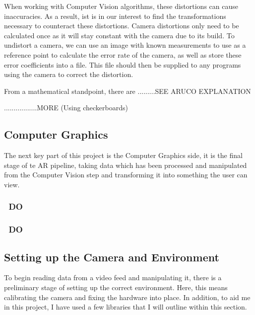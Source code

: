 \documentclass[11pt]{article}
\begin{document}
When working with Computer Vision algorithms, these distortions can cause
inaccuracies. As a result, ist is in our interest to find the transformations
necessary to counteract these distortions. Camera distortions only need to be 
calculated once as it will stay constant with the camera due to its build.
To undistort a camera, we can use an image with known measurements to use
as a reference point to calculate the error rate of the camera, as well as
store these error coefficients into a file. This file should then be supplied
to any programs using the camera to correct the distortion.

From a mathematical standpoint, there are .........SEE ARUCO EXPLANATION

.................MORE (Using checkerboards)

\subsection{Computer Graphics}
The next key part of this project is the Computer Graphics side, it is the
final stage of te AR pipeline, taking data which has been processed and
manipulated from the Computer Vision step and transforming it into something
the user can view.
\subsubsection{~DO~}
\subsubsection{~DO~}




\subsection{Setting up the Camera and Environment}
To begin reading data from a video feed and manipulating it, there 
is a preliminary stage of setting up the correct environment. Here,
this means calibrating the camera and fixing the hardware into place.
In addition, to aid me in this project, I have used a few libraries that
I will outline within this section.
\end{document}
